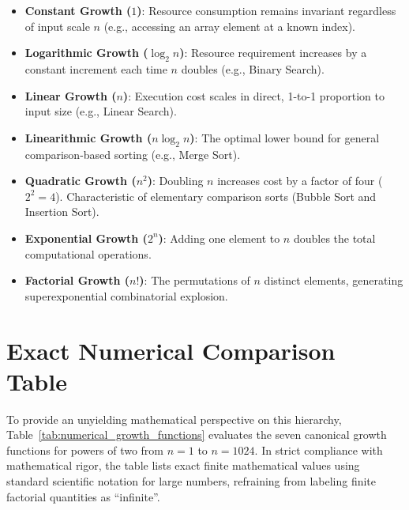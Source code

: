 \documentclass[11pt,a4paper,oneside]{report}
\theoremstyle{definition}
\begin{document}
\begin{itemize}
    \item \textbf{Constant Growth ($1$)}: Resource consumption remains invariant regardless of input scale $n$ (e.g., accessing an array element at a known index).
    \item \textbf{Logarithmic Growth ($\log_2 n$)}: Resource requirement increases by a constant increment each time $n$ doubles (e.g., Binary Search).
    \item \textbf{Linear Growth ($n$)}: Execution cost scales in direct, 1-to-1 proportion to input size (e.g., Linear Search).
    \item \textbf{Linearithmic Growth ($n \log_2 n$)}: The optimal lower bound for general comparison-based sorting (e.g., Merge Sort).
    \item \textbf{Quadratic Growth ($n^2$)}: Doubling $n$ increases cost by a factor of four ($2^2 = 4$). Characteristic of elementary comparison sorts (Bubble Sort and Insertion Sort).
    \item \textbf{Exponential Growth ($2^n$)}: Adding one element to $n$ doubles the total computational operations.
    \item \textbf{Factorial Growth ($n!$)}: The permutations of $n$ distinct elements, generating superexponential combinatorial explosion.
\end{itemize}

\section{Exact Numerical Comparison Table}
To provide an unyielding mathematical perspective on this hierarchy, Table~\ref{tab:numerical_growth_functions} evaluates the seven canonical growth functions for powers of two from $n = 1$ to $n = 1024$. In strict compliance with mathematical rigor, the table lists exact finite mathematical values using standard scientific notation for large numbers, refraining from labeling finite factorial quantities as ``infinite''.
\end{document}
